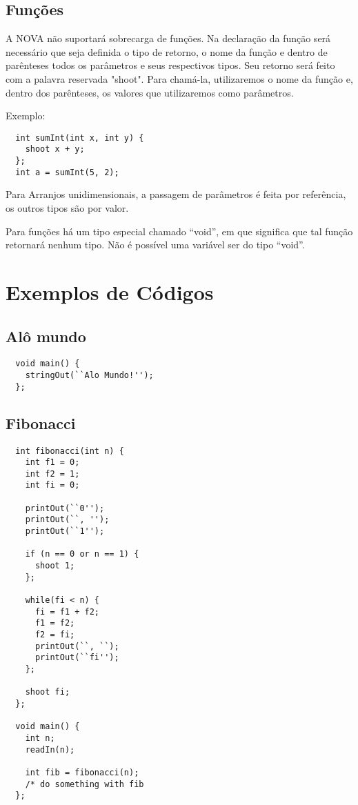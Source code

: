 \documentclass[a4paper, 12pt, article]{memoir}
\begin{document}
\subsection{Funções}
\label{subsec:function}
A NOVA não suportará sobrecarga de funções. Na declaração da função será necessário que seja definida o tipo de retorno, o nome da função e dentro de parênteses todos os parâmetros e seus respectivos tipos. Seu retorno será feito com a palavra reservada "shoot". Para chamá-la, utilizaremos o nome da função e, dentro dos parênteses, os valores que utilizaremos como parâmetros.

Exemplo:
\begin{lstlisting}
  int sumInt(int x, int y) {
    shoot x + y;
  };
  int a = sumInt(5, 2);
\end{lstlisting}

Para Arranjos unidimensionais, a passagem de parâmetros é feita por referência,
os outros tipos são por valor.

Para funções há um tipo especial chamado ``void'', em que significa que tal
função retornará nenhum tipo. Não é possível uma variável ser do tipo ``void''.

\newpage

\section{Exemplos de Códigos}
\label{sec:code}

\subsection{Alô mundo}
\label{subsec:helloworld}
\begin{lstlisting}
  void main() {
    stringOut(``Alo Mundo!'');
  };
\end{lstlisting}

\subsection{Fibonacci}
\label{subsec:fibonacci}
\begin{lstlisting}
  int fibonacci(int n) {
    int f1 = 0;
    int f2 = 1;
    int fi = 0;

    printOut(``0'');
    printOut(``, '');
    printOut(``1'');

    if (n == 0 or n == 1) {
      shoot 1;
    };

    while(fi < n) {
      fi = f1 + f2;
      f1 = f2;
      f2 = fi;
      printOut(``, ``);
      printOut(``fi'');
    };

    shoot fi;
  };

  void main() {
    int n;
    readIn(n);

    int fib = fibonacci(n);
    /* do something with fib
  };
\end{lstlisting}
\end{document}

